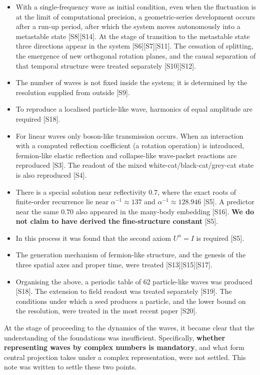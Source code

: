 \documentclass[
  10pt,
]{article}
\providecommand{\tightlist}{%
  \setlength{\itemsep}{0pt}\setlength{\parskip}{0pt}}
\begin{document}
\begin{itemize}
\tightlist
\item
  With a single-frequency wave as initial condition, even when the
  fluctuation is at the limit of computational precision, a
  geometric-series development occurs after a run-up period, after which
  the system moves autonomously into a metastable state
  {[}S8{]}{[}S14{]}. At the stage of transition to the metastable state
  three directions appear in the system {[}S6{]}{[}S7{]}{[}S11{]}. The
  cessation of splitting, the emergence of new orthogonal rotation
  planes, and the causal separation of that temporal structure were
  treated separately {[}S10{]}{[}S12{]}.
\item
  The number of waves is not fixed inside the system; it is determined
  by the resolution supplied from outside {[}S9{]}.
\item
  To reproduce a localised particle-like wave, harmonics of equal
  amplitude are required {[}S18{]}.
\item
  For linear waves only boson-like transmission occurs. When an
  interaction with a computed reflection coefficient (a rotation
  operation) is introduced, fermion-like elastic reflection and
  collapse-like wave-packet reactions are reproduced {[}S3{]}. The
  readout of the mixed white-cat/black-cat/grey-cat state is also
  reproduced {[}S4{]}.
\item
  There is a special solution near reflectivity \(0.7\), where the exact
  roots of finite-order recurrence lie near \(\alpha^{-1}\approx137\)
  and \(\alpha^{-1}\approx128.946\) {[}S5{]}. A predictor near the same
  \(0.70\) also appeared in the many-body embedding {[}S16{]}.
  \textbf{We do not claim to have derived the fine-structure constant}
  {[}S5{]}.
\item
  In this process it was found that the second axiom \(U^n = I\) is
  required {[}S5{]}.
\item
  The generation mechanism of fermion-like structure, and the genesis of
  the three spatial axes and proper time, were treated
  {[}S13{]}{[}S15{]}{[}S17{]}.
\item
  Organising the above, a periodic table of 62 particle-like waves was
  produced {[}S18{]}. The extension to field readout was treated
  separately {[}S19{]}. The conditions under which a seed produces a
  particle, and the lower bound on the resolution, were treated in the
  most recent paper {[}S20{]}.
\end{itemize}

At the stage of proceeding to the dynamics of the waves, it became clear
that the understanding of the foundations was insufficient.
Specifically, \textbf{whether representing waves by complex numbers is
mandatory}, and what form central projection takes under a complex
representation, were not settled. This note was written to settle these
two points.
\end{document}
